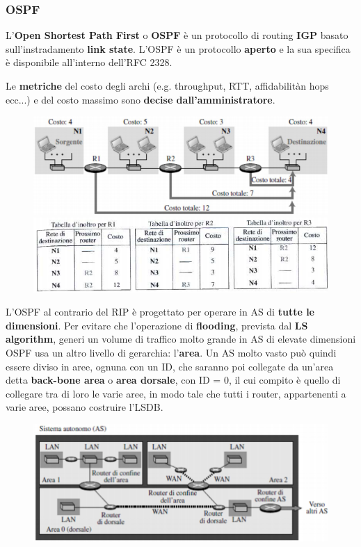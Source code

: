 \documentclass[11pt,a4paper,oneside]{book}
\theoremstyle{definition}
\begin{document}
\pagebreak

\subsubsection{OSPF}
L'\textbf{Open Shortest Path First} o \textbf{OSPF} è un protocollo di routing \textbf{IGP} basato sull'instradamento \textbf{link state}. L'OSPF è un protocollo \textbf{aperto} e la sua specifica è disponibile all'interno dell'RFC 2328.

Le \textbf{metriche} del costo degli archi (e.g. throughput, RTT, affidabilitàn hops ecc...) e del costo massimo sono \textbf{decise dall'amministratore}.

\begin{figure}[!h]
	\centering
	\includegraphics[scale=0.45]{Immagini/OSPF.png}
	\includegraphics[scale=0.45]{Immagini/OSPF1.png}
\end{figure}

L'OSPF al contrario del RIP è progettato per operare in AS di \textbf{tutte le dimensioni}. Per evitare che l'operazione di \textbf{flooding}, prevista dal \textbf{LS algorithm}, generi un volume di traffico molto grande in AS di elevate dimensioni OSPF usa un altro livello di gerarchia: l'\textbf{area}. Un AS molto vasto può quindi essere diviso in aree, ognuna con un ID, che saranno poi collegate da un'area detta \textbf{back-bone area} o \textbf{area dorsale}, con ID = 0, il cui compito è quello di collegare tra di loro le varie aree, in modo tale che tutti i router, appartenenti a varie aree, possano costruire l'LSDB.
\begin{figure}[!h]
	\centering
	\includegraphics[scale=0.45]{Immagini/Area.png}
\end{figure}
\end{document}
